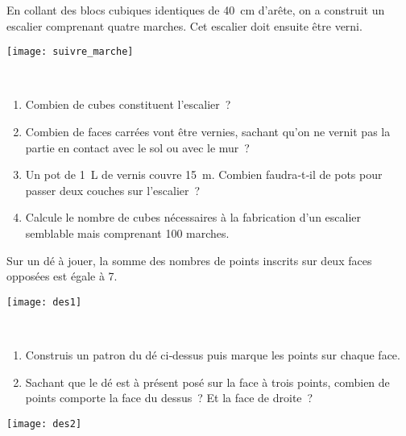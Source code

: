 \begin{exercice}
\begin{minipage}[c]{0.52\linewidth} 
En collant des blocs cubiques identiques de 40 cm d'arête, on a construit un escalier comprenant quatre marches. Cet escalier doit ensuite être verni.
 \end{minipage} \hfill%
 \begin{minipage}[c]{0.44\linewidth}
 \texttt{[image: suivre\_marche]}
  \end{minipage} \\
\begin{enumerate}
 \item Combien de cubes constituent l'escalier ?
 \item Combien de faces carrées vont être vernies, sachant qu'on ne vernit pas la partie en contact avec le sol ou avec le mur ?
 \item Un pot de 1 L de vernis couvre 15 m. Combien faudra‑t‑il de pots pour passer deux couches sur l'escalier ? 
 \item Calcule le nombre de cubes nécessaires à la fabrication d'un escalier semblable mais comprenant 100 marches.
 \end{enumerate}
\end{exercice}

\newpage

\begin{exercice}
\begin{minipage}[c]{0.78\linewidth} 
Sur un dé à jouer, la somme des nombres de points inscrits sur deux faces opposées est égale à 7.
 \end{minipage} \hfill%
 \begin{minipage}[c]{0.18\linewidth}
 \texttt{[image: des1]}
  \end{minipage} \\
\begin{minipage}[c]{0.78\linewidth} 
\begin{enumerate}
 \item Construis un patron du dé ci‑dessus puis marque les points sur chaque face.
 \item Sachant que le dé est à présent posé sur la face à trois points, combien de points comporte la face du dessus ? Et la face de droite ?
 \end{enumerate}
 \end{minipage} \hfill%
 \begin{minipage}[c]{0.18\linewidth}
 \texttt{[image: des2]}
  \end{minipage} \\
\end{exercice}


